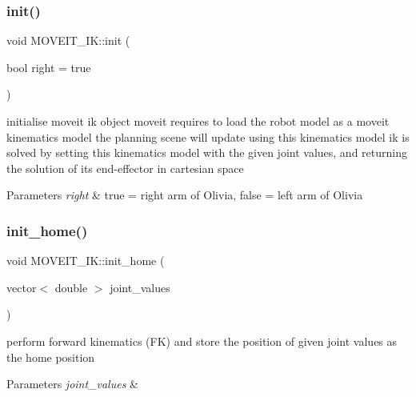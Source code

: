 \subsubsection{\texorpdfstring{init()}{init()}}
{\footnotesize\ttfamily void M\+O\+V\+E\+I\+T\+\_\+\+I\+K\+::init (\begin{DoxyParamCaption}\item[{bool}]{right = {\ttfamily true} }\end{DoxyParamCaption})\hspace{0.3cm}{\ttfamily [inline]}}



initialise moveit ik object moveit requires to load the robot model as a moveit kinematics model the planning scene will update using this kinematics model ik is solved by setting this kinematics model with the given joint values, and returning the solution of its end-\/effector in cartesian space 


\begin{DoxyParams}{Parameters}
{\em right} & true = right arm of Olivia, false = left arm of Olivia \\
\hline
\end{DoxyParams}
\mbox{\label{classMOVEIT__IK_af5b81c18b576ae1371ddc866061df1d5}} 
\subsubsection{\texorpdfstring{init\+\_\+home()}{init\_home()}}
{\footnotesize\ttfamily void M\+O\+V\+E\+I\+T\+\_\+\+I\+K\+::init\+\_\+home (\begin{DoxyParamCaption}\item[{vector$<$ double $>$}]{joint\+\_\+values }\end{DoxyParamCaption})\hspace{0.3cm}{\ttfamily [inline]}}



perform forward kinematics (FK) and store the position of given joint values as the home position 


\begin{DoxyParams}{Parameters}
{\em joint\+\_\+values} & \\
\hline
\end{DoxyParams}
\mbox{\label{classMOVEIT__IK_a0086f93313ee7036d8897d6156b1395b}} 
